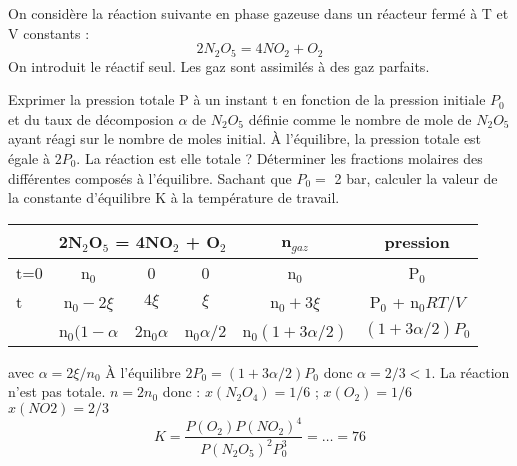 \begin{Exercise}[title=Réaction en phase gazeuse]
On considère la réaction suivante en phase gazeuse  dans un réacteur fermé à T et V constants :
\[2 N_2O_5 = 4 NO_2 + O_2 \]
On introduit le réactif seul. Les gaz sont assimilés à des gaz parfaits.

	\Question Exprimer la pression totale P à un instant t en fonction de la pression initiale $P_0$ et du taux de décomposion $\alpha$ de $N_2O_5$ définie comme le nombre de mole de $N_2O_5$ ayant réagi sur le nombre de moles initial.
	\Question À l'équilibre, la pression totale est égale à $ 2 P_0$. La  réaction est elle totale ? Déterminer les fractions molaires des différentes composés à l'équilibre.
	\Question Sachant que $P_0 = $ 2 bar, calculer la valeur de la constante d'équilibre K à la température de travail.
\end{Exercise}
\begin{Answer}
	\Question
		\begin{tabular}{l||c|c|c||c|c}
		& \multicolumn{3}{c}{2N$_2$O$_5$ = 4NO$_2$ + O$_2$} & n$_{gaz}$ & pression \\
		\hline
		 t=0 		&  n$_0$ 			&   0      		& 0    			& n$_0$     &  P$_0$ \\
		 t			&  n$_0-2\xi$		& $4\xi$   		&$\xi$			& n$_0+3\xi$&  P$_0$ + n$_0RT/V$ \\
		 			& n$_0(1-\alpha$ 	& 2n$_0\alpha$ 	&n$_0\alpha/2$ 	& n$_0(1+3\alpha/2)$& $(1+3\alpha/2)P_0$\\
		\end{tabular}
		avec $\alpha= 2\xi / n_0$
	\Question
	À l'équilibre $2P_0 = (1+3\alpha/2)P_0$ donc $\alpha = 2/3 < 1 $. La réaction n'est pas totale.
	$n=2n_0$ donc : $x(N_2O_4)=1/6$ ; $x(O_2)=1/6$ $x(NO2)=2/3$
	\Question
	\[ K = \frac{P(O_2)P(NO_2)^4}{P(N_2O_5)^2P_0^3}= \dots = 76\]
\end{Answer}
